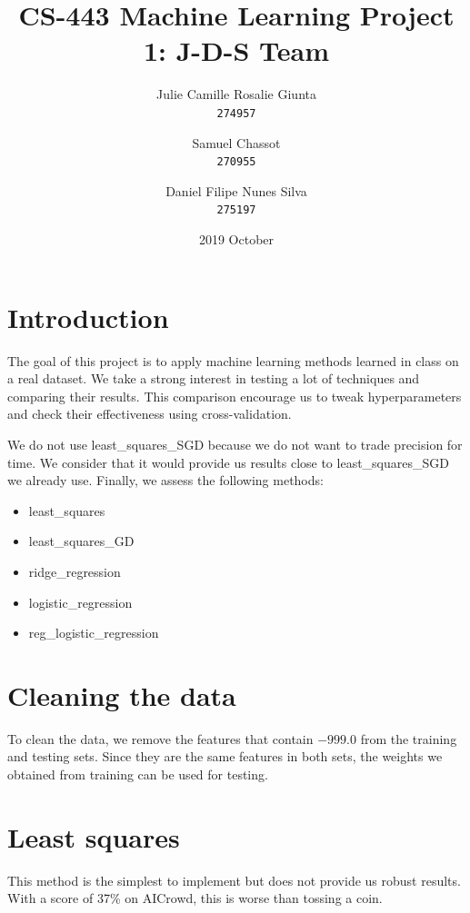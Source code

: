 \documentclass[11pt, a4paper, twocolumn]{article}
\begin{document}
\date{2019 October}
\title{CS-443 Machine Learning Project 1: J-D-S Team}
\author{
  Julie Camille Rosalie Giunta\\
  \texttt{274957}
  \and
  Samuel Chassot\\
  \texttt{270955}
  \and
  Daniel Filipe Nunes Silva\\
  \texttt{275197}
}

\maketitle
\clearpage

\section{Introduction}
The goal of this project is to apply machine learning
methods learned in class on a real dataset. We take a
strong interest in testing a lot of techniques and
comparing their results. This comparison encourage us to
tweak hyperparameters and check their effectiveness using cross-validation.

We do not use least\_squares\_SGD because we do not want
to trade precision for time. We consider
that it would provide us results close to
least\_squares\_SGD we already use. Finally, we assess the following
methods:

\begin{itemize}
  \item least\_squares
  \item least\_squares\_GD 
  \item ridge\_regression
  \item logistic\_regression
  \item reg\_logistic\_regression
\end{itemize}

\section{Cleaning the data}
To clean the data, we remove the features
that contain $-999.0$ from the training and testing sets. 
Since they are the same features in both sets, 
the weights we obtained from training can be used for testing.

\section{Least squares}
This method is the simplest to implement but does not
provide us robust results. With a score of 37\% on
AICrowd, this is worse than tossing a coin.
\end{document}
